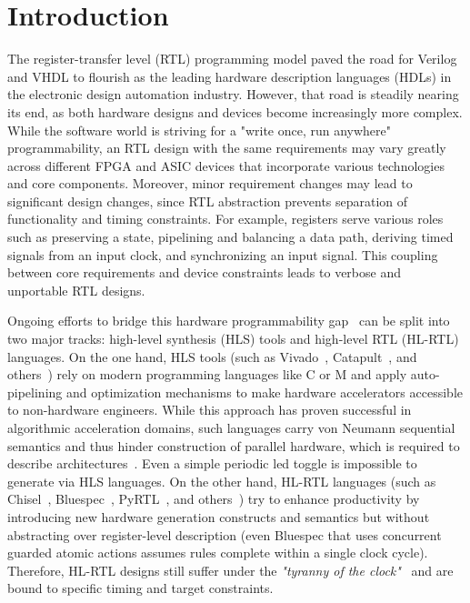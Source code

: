\section{Introduction}
The register-transfer level (RTL) programming model paved the road for Verilog and VHDL to flourish as the leading hardware description languages (HDLs) in the electronic design automation industry. However, that road is steadily nearing its end, as both hardware designs and devices become increasingly more complex. While the software world is striving for a "write once, run anywhere" programmability, an RTL design with the same requirements may vary greatly across different FPGA and ASIC devices that incorporate various technologies and core components. Moreover, minor requirement changes may lead to significant design changes, since RTL abstraction prevents separation of functionality and timing constraints. For example, registers serve various roles such as preserving a state, pipelining and balancing a data path, deriving timed signals from an input clock, and synchronizing an input signal. This coupling between core requirements and device constraints leads to verbose and unportable RTL designs. 

Ongoing efforts to bridge this hardware programmability gap~\cite{Kapre2016, Nane2016, Windh2015} can be split into two major tracks: high-level synthesis (HLS) tools and high-level RTL (HL-RTL) languages.
On the one hand, HLS tools (such as Vivado~\cite{Vivado2012}, Catapult~\cite{graphics2008catapult}, and others~\cite{Kavvadias2013, synphony2015}) rely on modern programming languages like C or M and apply  auto-pipelining and optimization mechanisms to make hardware accelerators accessible to non-hardware engineers. While this approach has proven successful in algorithmic acceleration domains, such languages carry von Neumann sequential semantics and thus hinder construction of parallel hardware, which is required to describe architectures~\cite{Zhao2017}. Even a simple periodic led toggle is impossible to generate via HLS languages.
On the other hand, HL-RTL languages (such as Chisel~\cite{Bachrach2012}, Bluespec~\cite{nikhil2004bluespec}, PyRTL~\cite{Clow2017}, and others~\cite{Charles2016, Liu2017, jiang2018mamba, decaluwe2004myhdl, CxLang2014, Lockhart2014}) try to enhance productivity by introducing new hardware generation constructs and semantics but without abstracting over register-level description (even Bluespec that uses concurrent guarded atomic actions assumes rules complete within a single clock cycle). Therefore, HL-RTL designs still suffer under the \emph{"tyranny of the clock"}~\cite{Sutherland2012} and are bound to specific timing and target constraints.



